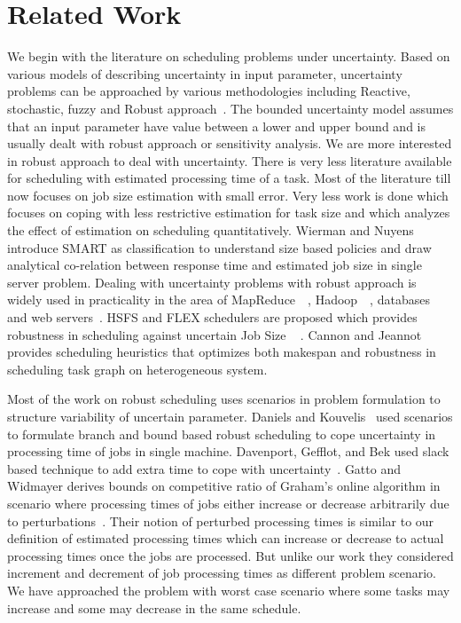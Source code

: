 \documentclass[10pt, conference, compsocconf]{IEEEtran}
\begin{document}
\section{Related Work}
We begin with the literature on scheduling problems under uncertainty. Based on various models of describing uncertainty in input parameter, uncertainty problems can be approached by various methodologies including Reactive, stochastic, fuzzy and Robust approach~\cite{DBLP:journals/cce/LiI08}. The bounded uncertainty model assumes that an input parameter have value between a lower and upper bound and is usually dealt with robust approach or sensitivity analysis. We are more interested in robust approach to deal with uncertainty. There is very less literature available for scheduling with estimated processing time of a task. Most of the literature till now focuses on job size estimation with small error. Very less work is done which focuses on coping with less restrictive estimation for task size and which analyzes the effect of estimation on scheduling quantitatively. Wierman and Nuyens~\cite{conf/sigmetrics/WiermanN08} introduce  SMART as classification to understand size based policies and draw analytical co-relation between response time and estimated job size in single server problem. Dealing with uncertainty problems with robust approach
is widely used in practicality in the area of MapReduce~\cite{Kavulya:2010:ATP:1844765.1845224}~\cite{Verma:2011:AAR:1998582.1998637}, Hadoop~\cite{Wolf:2010:FSA:2023718.2023720}~\cite{White:2009:HDG:1717298}, databases~\cite{Lipton199518} and web servers~\cite{Cardellini99dynamicload}. HSFS and FLEX  schedulers are proposed which provides robustness in scheduling against uncertain Job Size ~\cite{Wolf:2010:FSA:2023718.2023720}  \cite{6691554}. Cannon and Jeannot ~\cite{cj09c} provides scheduling heuristics that optimizes both makespan and robustness in scheduling task graph on heterogeneous system.

 Most of the work on robust scheduling uses scenarios in problem formulation to structure variability of uncertain parameter. Daniels and Kouvelis~\cite{citeulike:8334169} used scenarios to formulate branch and bound based robust scheduling to cope uncertainty in processing time of jobs in single machine. Davenport, Gefflot, and Bek used slack based technique to add extra time to cope with uncertainty~\cite{Davenport_slack-basedtechniques}. Gatto and Widmayer derives bounds on competitive ratio of Graham’s online algorithm in scenario where processing times of jobs either increase or decrease arbitrarily due to perturbations~\cite{Gatto07}.  Their notion of perturbed processing times is similar to our definition of estimated processing times which can increase or decrease to actual processing times once the jobs are processed. But unlike our work they considered increment and decrement of job processing times as different problem scenario. We have approached the problem with worst case scenario where some tasks may increase and some may decrease in the same schedule.
  
\end{document}
